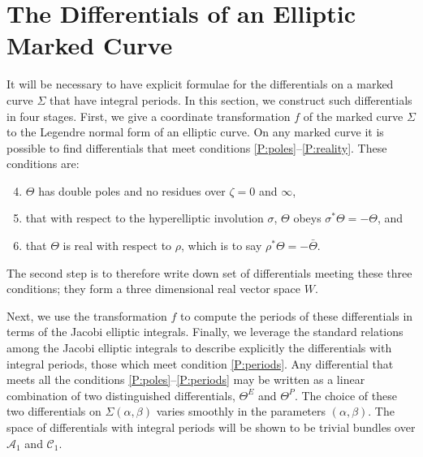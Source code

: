 \section{The Differentials of an Elliptic Marked Curve}
\label{sec:Differentials}
It will be necessary to have explicit formulae for the differentials on a marked curve $Σ$ that have integral periods. In this section, we construct such differentials in four stages. First, we give a coordinate transformation $f$ of the marked curve $Σ$ to the Legendre normal form of an elliptic curve. On any marked curve it is possible to find differentials that meet conditions \ref{P:poles}--\ref{P:reality}.
These conditions are:
\begin{enumerate}[label=(P.\arabic*)]
\setcounter{enumi}{3}
\item
$Θ$ has double poles and no residues over $ζ=0$ and $\infty$,
\item
that with respect to the hyperelliptic involution $σ$, $Θ$ obeys $σ^*Θ = - Θ$, and
\item
that $Θ$ is real with respect to $ρ$, which is to say $ρ^* Θ = - \bar{Θ}$.
\end{enumerate}
The second step is to therefore write down set of differentials meeting these three conditions; they form a three dimensional real vector space $W$.

Next, we use the transformation $f$ to compute the periods of these differentials in terms of the Jacobi elliptic integrals. Finally, we leverage the standard relations among the Jacobi elliptic integrals to describe explicitly the differentials with integral periods, those which meet condition \ref{P:periods}. Any differential that meets all the conditions \ref{P:poles}--\ref{P:periods} may be written as a linear combination of two distinguished differentials, $Θ^E$ and $Θ^P$. The choice of these two differentials on $Σ(α,β)$ varies smoothly in the parameters $(α,β)$. The space of differentials with integral periods will be shown to be trivial bundles over $\mathcal{A}_1$ and $\mathcal{C_1}$.

